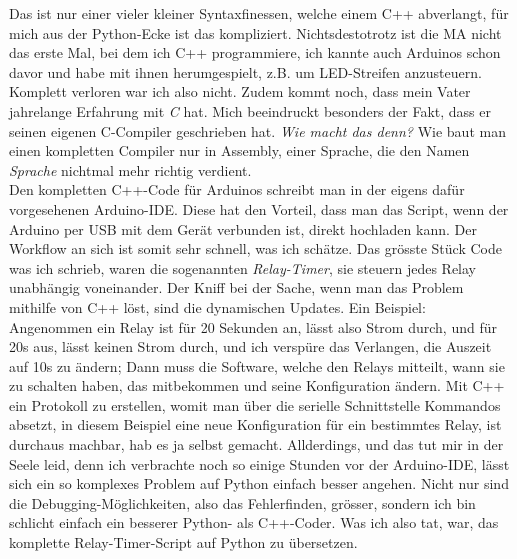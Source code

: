 \documentclass[12pt,titlepage,a4paper]{article}
\begin{document}
Das ist nur einer vieler kleiner Syntaxfinessen, welche einem C++ abverlangt, für mich aus der Python-Ecke ist das kompliziert. Nichtsdestotrotz ist die MA nicht das erste Mal, bei dem ich C++ programmiere, ich kannte auch Arduinos schon davor und habe mit ihnen herumgespielt, z.B. um LED-Streifen anzusteuern. Komplett verloren war ich also nicht. Zudem kommt noch, dass mein Vater jahrelange Erfahrung mit \textit{C} hat. Mich beeindruckt besonders der Fakt, dass er seinen eigenen C-Compiler geschrieben hat. \textit{Wie macht das denn?} Wie baut man einen kompletten Compiler nur in Assembly, einer Sprache, die den Namen \textit{Sprache} nichtmal mehr richtig verdient.\\Den kompletten C++-Code für Arduinos schreibt man in der eigens dafür vorgesehenen Arduino-IDE. Diese hat den Vorteil, dass man das Script, wenn der Arduino per USB mit dem Gerät verbunden ist, direkt hochladen kann. Der Workflow an sich ist somit sehr schnell, was ich schätze. Das grösste Stück Code was ich schrieb, waren die sogenannten \textit{Relay-Timer}, sie steuern jedes Relay unabhängig voneinander. Der Kniff bei der Sache, wenn man das Problem mithilfe von C++ löst, sind die dynamischen Updates. Ein Beispiel: Angenommen ein Relay ist für 20 Sekunden an, lässt also Strom durch, und für 20s aus, lässt keinen Strom durch, und ich verspüre das Verlangen, die Auszeit auf 10s zu ändern; Dann muss die Software, welche den Relays mitteilt, wann sie zu schalten haben, das mitbekommen und seine Konfiguration ändern. Mit C++ ein Protokoll zu erstellen, womit man über die serielle Schnittstelle Kommandos absetzt, in diesem Beispiel eine neue Konfiguration für ein bestimmtes Relay, ist durchaus machbar, hab es ja selbst gemacht. Allderdings, und das tut mir in der Seele leid, denn ich verbrachte noch so einige Stunden vor der Arduino-IDE, lässt sich ein so komplexes Problem auf Python einfach besser angehen. Nicht nur sind die Debugging-Möglichkeiten, also das Fehlerfinden, grösser, sondern ich bin schlicht einfach ein besserer Python- als C++-Coder. Was ich also tat, war, das komplette Relay-Timer-Script auf Python zu übersetzen.\\
\end{document}
